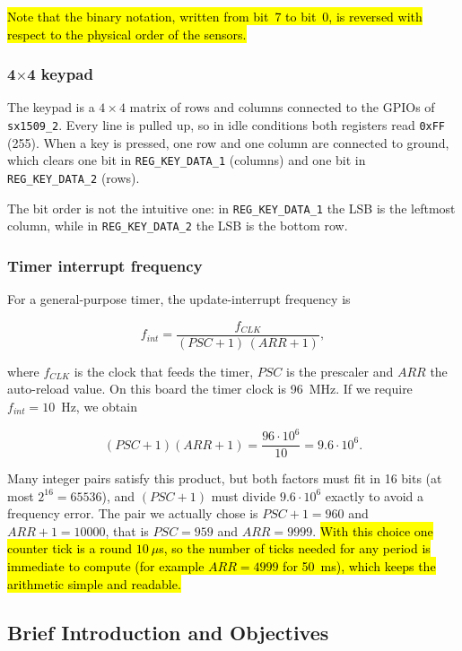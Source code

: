 \documentclass[english]{article}
\begin{document}
\noindent \hl{Note that the binary notation, written from bit~7 to bit~0, is reversed with respect to the physical
  order of the sensors.}

\subsubsection{4$\times$4 keypad}

The keypad is a $4\times4$ matrix of rows and columns connected to the GPIOs of \texttt{sx1509\_2}. Every line
is pulled up, so in idle conditions both registers read \texttt{0xFF} (255). When a key is pressed, one row
and one column are connected to ground, which clears one bit in \texttt{REG\_KEY\_DATA\_1} (columns) and one
bit in \texttt{REG\_KEY\_DATA\_2} (rows).

The bit order is not the intuitive one: in \texttt{REG\_KEY\_DATA\_1} the LSB is the leftmost column, while
in \texttt{REG\_KEY\_DATA\_2} the LSB is the bottom row.

\subsubsection{Timer interrupt frequency}

For a general-purpose timer, the update-interrupt frequency is

\begin{equation}
  f_{int} = \frac{f_{CLK}}{(PSC+1)\,(ARR+1)}, \label{eq:lab1-timer}
\end{equation}

\noindent where $f_{CLK}$ is the clock that feeds the timer, $PSC$ is the prescaler and $ARR$ the
auto-reload value. On this board the timer clock is 96~MHz. If we require $f_{int}=10$~Hz, we obtain

\begin{equation}
  (PSC+1)(ARR+1) = \frac{96\cdot10^{6}}{10} = 9.6\cdot10^{6}.
\end{equation}

Many integer pairs satisfy this product, but both factors must fit in 16 bits (at most $2^{16}=65536$), and
$(PSC+1)$ must divide $9.6\cdot10^{6}$ exactly to avoid a frequency error. The pair we actually chose is
$PSC+1 = 960$ and $ARR+1 = 10000$, that is $PSC=959$ and $ARR=9999$. \hl{With this choice one counter tick is a
  round $10~\mu$s, so the number of ticks needed for any period is immediate to compute (for example $ARR=4999$
  for 50~ms), which keeps the arithmetic simple and readable.}

\subsection{Brief Introduction and Objectives}
\end{document}
